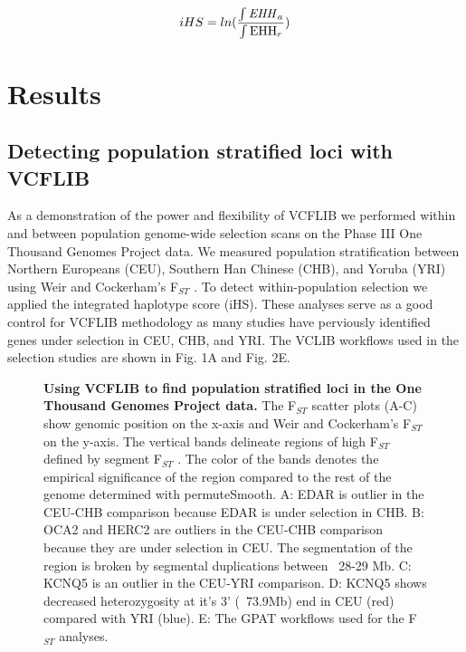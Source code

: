 \documentclass[10pt,letterpaper]{article}
\begin{document}
\begin{equation}\label{eq:iHS} 
iHS = ln(\frac{\int \textrm{\textit{EHH}}_a}{ \int \textrm{EHH}_r } )
\end{equation}









\section*{Results}

\subsection*{Detecting population stratified loci with VCFLIB}

As a demonstration of the power and flexibility of VCFLIB we performed within and between population genome-wide selection scans on the Phase III One Thousand Genomes Project data.  We measured population stratification between Northern Europeans (CEU), Southern Han Chinese (CHB), and Yoruba (YRI) using Weir and Cockerham's  F$_{ST}$ .  To detect within-population selection we applied the integrated haplotype score (iHS).  These analyses serve as a good control for VCFLIB methodology as many studies have perviously identified genes under selection in CEU, CHB, and YRI.  The VCLIB workflows used in the selection studies are shown in Fig. 1A and Fig. 2E.

\begin{figure}[h]

\caption{{\bf Using VCFLIB to find population stratified loci in the One Thousand Genomes Project data.} The  F$_{ST}$  scatter plots (A-C) show genomic position on the x-axis and Weir and Cockerham's  F$_{ST}$  on the y-axis.  The vertical bands delineate regions of high  F$_{ST}$  defined by segment F$_{ST}$ .  The color of the bands denotes the empirical significance of the region compared to the rest of the genome determined with permuteSmooth.  A: EDAR is outlier in the CEU-CHB comparison because EDAR is under selection in CHB.  B: OCA2 and HERC2 are outliers in the CEU-CHB comparison because they are under selection in CEU.  The segmentation of the region is broken by segmental duplications between ~28-29 Mb.  C: KCNQ5 is an outlier in the CEU-YRI comparison.  D:  KCNQ5 shows decreased heterozygosity at it's 3' (~73.9Mb) end in CEU (red) compared with YRI (blue).  E: The GPAT workflows used for the  F$_{ST}$  analyses. }
\label{fig1}
\end{figure}
\end{document}
